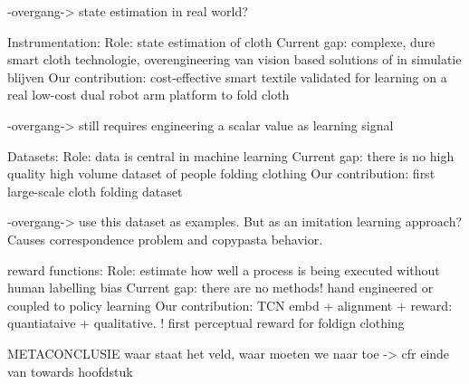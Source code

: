 \documentclass[\home/main.tex]{subfiles}
\begin{document}
-overgang-> state estimation in real world?

Instrumentation:
    Role: state estimation of cloth 
    Current gap: complexe, dure smart cloth technologie, overengineering van vision based solutions of in simulatie blijven 
    Our contribution: cost-effective smart textile validated for learning on a real low-cost dual robot arm platform to fold cloth 

-overgang-> still requires engineering a scalar value as learning signal 

Datasets:
    Role: data is central in machine learning 
    Current gap: there is no high quality high volume dataset of people folding clothing 
    Our contribution: first large-scale cloth folding dataset

-overgang-> use this dataset as examples. But as an imitation learning approach? Causes correspondence problem and copypasta behavior. 

reward functions:
    Role: estimate how well a process is being executed without human labelling bias
    Current gap: there are no methods! hand engineered or coupled to policy learning 
    Our contribution: TCN embd + alignment + reward: quantiataive + qualitative. ! first perceptual reward for foldign clothing

METACONCLUSIE
    waar staat het veld, waar moeten we naar toe -> cfr einde van towards hoofdstuk 

\glsresetall
\end{document}
